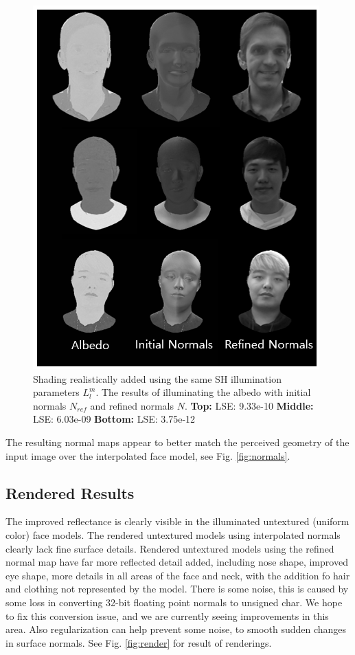 \documentclass[10pt,twocolumn,letterpaper]{article}
\begin{document}
\begin{figure}[!h]
    \begin{center}
        \includegraphics [scale=0.75] {image/grey-sh.png}
    \end{center}
    \caption{Shading realistically added using the same SH illumination parameters $L_l^m$. The results of illuminating the albedo with initial normals $N_{ref}$ and refined normals $N$. \textbf{Top:} LSE: 9.33e-10 \textbf{Middle:} LSE: 6.03e-09 \textbf{Bottom:} LSE: 3.75e-12}
    \label{fig:grey}
\end{figure} 
The resulting normal maps appear to better match the perceived geometry of the input image over the interpolated face model, see Fig. \ref{fig:normals}.

\subsection{Rendered Results}
The improved reflectance is clearly visible in the illuminated untextured (uniform color) face models. The rendered untextured models using interpolated normals clearly lack fine surface details. Rendered untextured models using the refined normal map have far more reflected detail added, including nose shape, improved eye shape, more details in all areas of the face and neck, with the addition fo hair and clothing not represented by the model. There is some noise, this is caused by some loss in converting 32-bit floating point normals to unsigned char. We hope to fix this conversion issue, and we are currently seeing improvements in this area. Also regularization can help prevent some noise, to smooth sudden changes in surface normals. See Fig. \ref{fig:render} for result of renderings.
\end{document}
